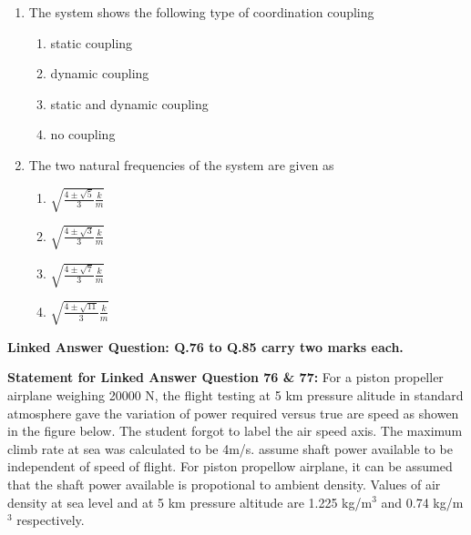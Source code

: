 \documentclass[journal]{IEEEtran}
\begin{document}
\begin{enumerate}
    \item The system shows the following type of coordination coupling
        \begin{enumerate}
            \item static coupling
            \item dynamic coupling
            \item static and dynamic coupling
            \item no coupling
        \end{enumerate}
    \item The two natural frequencies of the system are given as
        \begin{enumerate}
            \item $\displaystyle\sqrt{\frac{4\pm\sqrt{5}}{3}\frac{k}{m}}$
            \item $\displaystyle\sqrt{\frac{4\pm\sqrt{3}}{3}\frac{k}{m}}$
            \item $\displaystyle\sqrt{\frac{4\pm\sqrt{7}}{3}\frac{k}{m}}$
            \item $\displaystyle\sqrt{\frac{4\pm\sqrt{11}}{3}\frac{k}{m}}$
        \end{enumerate}
\end{enumerate}

\textbf{Linked Answer Question: Q.76 to Q.85 carry two marks each.}

\textbf{Statement for Linked Answer Question 76 \& 77:} For a piston propeller airplane weighing 20000 N, the flight testing at 5 km pressure alitude in standard atmosphere gave the variation of power required versus true are speed as showen in the figure below. The student forgot to label the air speed axis. The maximum climb rate at sea was calculated to be 4m/s. assume shaft power available to be independent of speed of flight. For piston propellow airplane, it can be assumed that the shaft power available is propotional to ambient density. Values of air density at sea level and at 5 km pressure altitude are 1.225 kg/m$^3$ and 0.74 kg/m$^3$ respectively.
\end{document}
